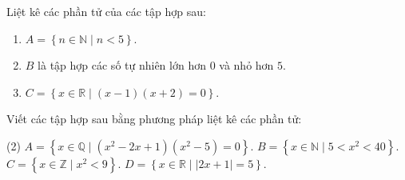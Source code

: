 \begin{baitap}%
	Liệt kê các phần tử của các tập hợp sau:
	\begin{enumerate}
		\item $A=\left\lbrace n\in \mathbb{N} \mid n<5\right\rbrace$.
		\item $B$ là tập hợp các số tự nhiên lớn hơn $0$ và nhỏ hơn $5$.
		\item $C=\left\lbrace x\in \mathbb{R}\mid (x-1)(x+2)=0\right\rbrace$.
	\end{enumerate}
\end{baitap}
\begin{baitap}%
	Viết các tập hợp sau bằng phương pháp liệt kê các phần tử:
	\begin{tasks}(2)
		\task $A=\left\lbrace  x\in \mathbb{Q}\mid (x^2-2x+1)(x^2-5)=0\right\rbrace$.
		\task $B=\left\lbrace x \in \mathbb{N}\mid 5<x^2<40\right\rbrace$.
		\task $C=\left\lbrace x\in \mathbb{Z}\mid x^2<9\right\rbrace$.
		\task $D=\left\lbrace x\in \mathbb{R}\mid \left|2x+1\right|=5\right\rbrace$.
	\end{tasks}
\end{baitap}



